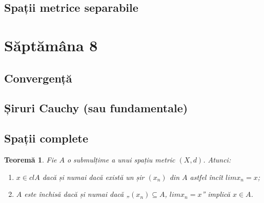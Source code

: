 \documentclass[a4paper,12pt]{article}
\theoremstyle{change}
\newtheorem{theorem}{Teoremă}[section]
\begin{document}
\subsection{Spații metrice separabile}

\section{Săptămâna 8}


\subsection{Convergență}

\subsection{Șiruri Cauchy (sau fundamentale)}


\subsection{Spații complete}

\begin{theorem}
Fie $A$ o submulțime a unui spațiu metric $(X,d)$. Atunci:
\begin{enumerate}
\item $x\in cl A$ dacă și numai dacă există un șir $(x_n)$ din $A$ astfel încît $lim x_n = x$;
\item $A$ este închisă dacă și numai dacă „$(x_n)\subseteq A$, $lim x_n = x$” implică $x\in A$.
\end{enumerate}
\end{theorem}
\end{document}
